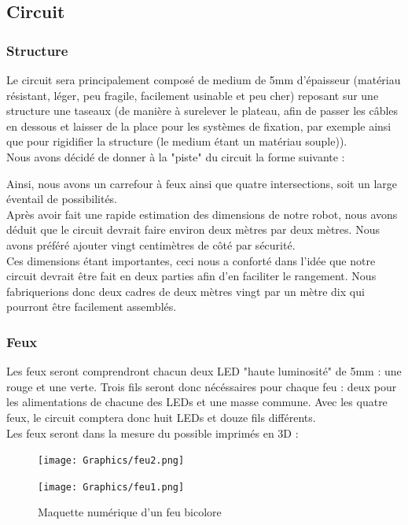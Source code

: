 \subsection{Circuit}

	\subsubsection{Structure}

		Le circuit sera principalement composé de medium de 5mm d'épaisseur (matériau résistant, léger, peu fragile, facilement usinable et peu cher) reposant sur une structure une taseaux (de manière à surelever le plateau, afin de passer les câbles en dessous et laisser de la place pour les systèmes de fixation, par exemple ainsi que pour rigidifier la structure (le medium étant un matériau souple)).\\

		Nous avons décidé de donner à la "piste" du circuit la forme suivante :


		Ainsi, nous avons un carrefour à feux ainsi que quatre intersections, soit un large éventail de possibilités.\\

		Après avoir fait une rapide estimation des dimensions de notre robot, nous avons déduit que le circuit devrait faire environ deux mètres par deux mètres.
		Nous avons préféré ajouter vingt centimètres de côté par sécurité.\\

		Ces dimensions étant importantes, ceci nous a conforté dans l'idée que notre circuit devrait être fait en deux parties afin d'en faciliter le rangement. Nous fabriquerions donc deux cadres de deux mètres vingt par un mètre dix qui pourront être facilement assemblés.

	\subsubsection{Feux}

		Les feux seront comprendront chacun deux LED "haute luminosité" de 5mm : une rouge et une verte. Trois fils seront donc nécéssaires pour chaque feu : deux pour les alimentations de chacune des LEDs et une masse commune. Avec les quatre feux, le circuit comptera donc huit LEDs et douze fils différents.\\
		\newpage
		Les feux seront dans la mesure du possible imprimés en 3D :\\
		\begin{figure}[ht!]
			\centering
			\begin{minipage}{0.4\textwidth}
				\raggedleft
				\texttt{[image: Graphics/feu2.png]}
			\end{minipage}\hfill
			\begin{minipage}{0.4\textwidth}
				\raggedright
				\texttt{[image: Graphics/feu1.png]}
			\end{minipage}
			\caption{Maquette numérique d'un feu bicolore}
		\end{figure}

